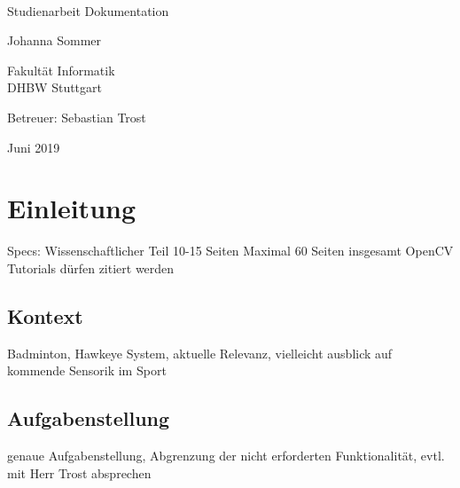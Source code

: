 \documentclass[11pt,a4paper,oldfontcommands]{memoir}
\begin{document}
%
%
\thispagestyle{empty}

{%
\sffamily
\centering
\Large

~\vspace{\fill}

{\huge 
Studienarbeit Dokumentation
}

\vspace{2.5cm}

{\LARGE
Johanna Sommer
}

\vspace{3.5cm}

Fakultät Informatik \\
DHBW Stuttgart

\vspace{3.5cm}

Betreuer: Sebastian Trost

\vspace{\fill}

Juni 2019

}%

\cleardoublepage

\tableofcontents

\clearpage


\chapter{Einleitung}
Specs: 
Wissenschaftlicher Teil 10-15 Seiten
Maximal 60 Seiten insgesamt
OpenCV Tutorials dürfen zitiert werden
\section{Kontext}
Badminton, Hawkeye System, aktuelle Relevanz, vielleicht ausblick auf kommende Sensorik im Sport
\section{Aufgabenstellung}
genaue Aufgabenstellung, Abgrenzung der nicht erforderten Funktionalität, evtl. mit Herr Trost absprechen
\end{document}
